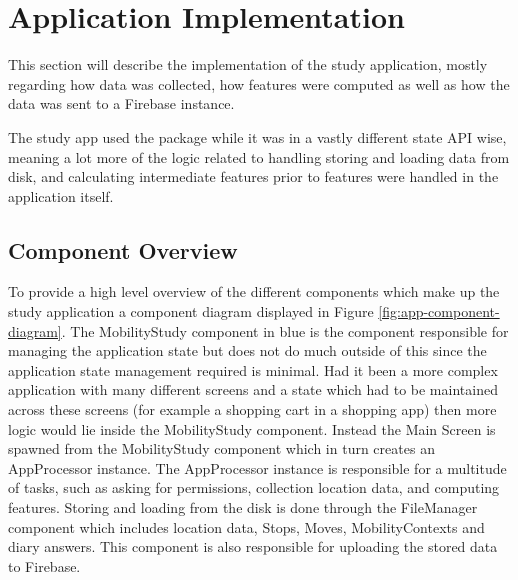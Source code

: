 \section{Application Implementation}
This section will describe the implementation of the study application, mostly regarding how data was collected, how features were computed as well as how the data was sent to a Firebase instance. 

The study app used the package while it was in a vastly different state API wise, meaning a lot more of the logic related to handling storing and loading data from disk, and calculating intermediate features prior to features were handled in the application itself.

\subsection{Component Overview}
To provide a high level overview of the different components which make up the study application a component diagram displayed in Figure \ref{fig:app-component-diagram}. The MobilityStudy component in blue is the component responsible for managing the application state but does not do much outside of this since the application state management required is minimal. Had it been a more complex application with many different screens and a state which had to be maintained across these screens (for example a shopping cart in a shopping app) then more logic would lie inside the MobilityStudy component. Instead the Main Screen is spawned from the MobilityStudy component which in turn creates an AppProcessor instance. The AppProcessor instance is responsible for a multitude of tasks, such as asking for permissions, collection location data, and computing features. Storing and loading from the disk is done through the FileManager component which includes location data, Stops, Moves, MobilityContexts and diary answers. This component is also responsible for uploading the stored data to Firebase.


